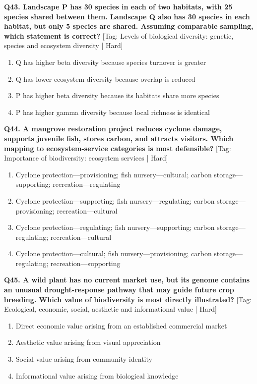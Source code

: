 \noindent\textbf{Q43. Landscape P has 30 species in each of two habitats, with 25 species shared between them. Landscape Q also has 30 species in each habitat, but only 5 species are shared. Assuming comparable sampling, which statement is correct?} \hfill [Tag: Levels of biological diversity: genetic, species and ecosystem diversity | Hard]
\begin{enumerate}[label=(\alph*),topsep=2pt,itemsep=1pt,partopsep=0pt,parsep=0pt]
    \item {Q has higher beta diversity because species turnover is greater}
    \item {Q has lower ecosystem diversity because overlap is reduced}
    \item {P has higher beta diversity because its habitats share more species}
    \item {P has higher gamma diversity because local richness is identical}
\end{enumerate}
\vspace{2mm}

\noindent\textbf{Q44. A mangrove restoration project reduces cyclone damage, supports juvenile fish, stores carbon, and attracts visitors. Which mapping to ecosystem-service categories is most defensible?} \hfill [Tag: Importance of biodiversity: ecosystem services | Hard]
\begin{enumerate}[label=(\alph*),topsep=2pt,itemsep=1pt,partopsep=0pt,parsep=0pt]
    \item {Cyclone protection---provisioning; fish nursery---cultural; carbon storage---supporting; recreation---regulating}
    \item {Cyclone protection---supporting; fish nursery---regulating; carbon storage---provisioning; recreation---cultural}
    \item {Cyclone protection---regulating; fish nursery---supporting; carbon storage---regulating; recreation---cultural}
    \item {Cyclone protection---cultural; fish nursery---provisioning; carbon storage---regulating; recreation---supporting}
\end{enumerate}
\vspace{2mm}

\noindent\textbf{Q45. A wild plant has no current market use, but its genome contains an unusual drought-response pathway that may guide future crop breeding. Which value of biodiversity is most directly illustrated?} \hfill [Tag: Ecological, economic, social, aesthetic and informational value | Hard]
\begin{enumerate}[label=(\alph*),topsep=2pt,itemsep=1pt,partopsep=0pt,parsep=0pt]
    \item {Direct economic value arising from an established commercial market}
    \item {Aesthetic value arising from visual appreciation}
    \item {Social value arising from community identity}
    \item {Informational value arising from biological knowledge}
\end{enumerate}
\vspace{2mm}

